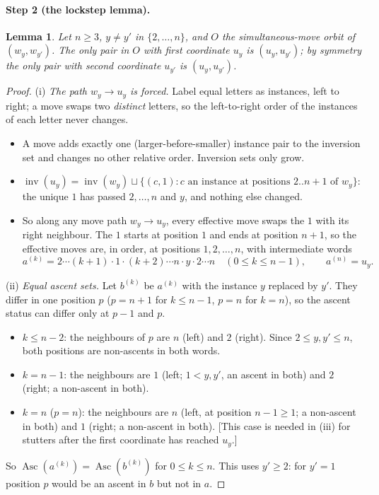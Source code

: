 \documentclass[11pt]{amsart}
\newcommand{\Asc}{\operatorname{Asc}}
\newcommand{\inv}{\operatorname{inv}}
\theoremstyle{plain}
\newtheorem{lemma}[theorem]{Lemma}
\theoremstyle{definition}
\begin{document}
\paragraph{Step 2 (the lockstep lemma).}
\begin{lemma}\label{lem:lockstep}
Let $n\ge3$, $y\ne y'$ in $\{2,\dots,n\}$, and $O$ the simultaneous-move orbit of $(w_y,w_{y'})$. The only pair in $O$ with first coordinate $u_y$ is $(u_y,u_{y'})$; by symmetry the only pair with second coordinate $u_{y'}$ is $(u_y,u_{y'})$.
\end{lemma}
\begin{proof}
(i) \emph{The path $w_y\to u_y$ is forced.} Label equal letters as instances, left to right; a move swaps two \emph{distinct} letters, so the left-to-right order of the instances of each letter never changes.
\begin{itemize}[leftmargin=1.2em,itemsep=1pt]
\item A move adds exactly one (larger-before-smaller) instance pair to the inversion set and changes no other relative order. Inversion sets only grow.
\item $\inv(u_y)=\inv(w_y)\sqcup\{(c,1): c \text{ an instance at positions }2..n+1\text{ of }w_y\}$: the unique $1$ has passed $2,\dots,n$ and $y$, and nothing else changed.
\item So along any move path $w_y\to u_y$, every effective move swaps the $1$ with its right neighbour. The $1$ starts at position $1$ and ends at position $n+1$, so the effective moves are, in order, at positions $1,2,\dots,n$, with intermediate words
\[a^{(k)}=2\cdots(k+1)\cdot1\cdot(k+2)\cdots n\cdot y\cdot2\cdots n\quad(0\le k\le n-1),\qquad a^{(n)}=u_y.\]
\end{itemize}
(ii) \emph{Equal ascent sets.} Let $b^{(k)}$ be $a^{(k)}$ with the instance $y$ replaced by $y'$. They differ in one position $p$ ($p=n+1$ for $k\le n-1$, $p=n$ for $k=n$), so the ascent status can differ only at $p-1$ and $p$.
\begin{itemize}[leftmargin=1.2em,itemsep=1pt]
\item $k\le n-2$: the neighbours of $p$ are $n$ (left) and $2$ (right). Since $2\le y,y'\le n$, both positions are non-ascents in both words.
\item $k=n-1$: the neighbours are $1$ (left; $1<y,y'$, an ascent in both) and $2$ (right; a non-ascent in both).
\item $k=n$ ($p=n$): the neighbours are $n$ (left, at position $n-1\ge1$; a non-ascent in both) and $1$ (right; a non-ascent in both). [This case is needed in (iii) for stutters after the first coordinate has reached $u_y$.]
\end{itemize}
So $\Asc(a^{(k)})=\Asc(b^{(k)})$ for $0\le k\le n$. This uses $y'\ge2$: for $y'=1$ position $p$ would be an ascent in $b$ but not in $a$.


\end{proof}
\end{document}
